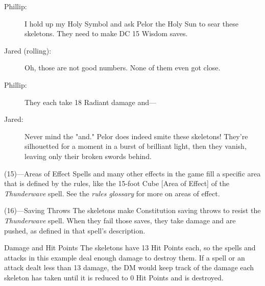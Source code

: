 \documentclass[10pt,a4paper,twoside,bg=print,twocolumn,openany,nodeprecatedcode]{dndbook}
\begin{document}
{\par \vspace { 9pt plus 3pt minus 3pt } \noindent  {} \nopagebreak }

\begin{description}
\item[Phillip:]
I hold up my Holy Symbol and ask Pelor the Holy Sun to sear these skeletons. They need to make DC 15 Wisdom saves.
\end{description}


\begin{description}
\item[Jared (rolling):]
Oh, those are not good numbers. None of them even got close.
\item[Phillip:]
They each take 18 Radiant damage and—
\item[Jared:]
Never mind the "and." Pelor does indeed smite these skeletons! They're silhouetted for a moment in a burst of brilliant light, then they vanish, leaving only their broken swords behind.
\end{description}

\begin{DndSidebar}[float=!b]{(15)—Areas of Effect}
Spells and many other effects in the game fill a specific area that is defined by the rules, like the 15-foot Cube [Area of Effect] of the \textit{Thunderwave} spell. See the \textit{rules glossary} for more on areas of effect.



\end{DndSidebar}

\begin{DndSidebar}[float=!b]{(16)—Saving Throws}
The skeletons make Constitution saving throws to resist the \textit{Thunderwave} spell. When they fail those saves, they take damage and are pushed, as defined in that spell's description.



\end{DndSidebar}

\begin{DndSidebar}[float=!b]{Damage and Hit Points}
The skeletons have 13 Hit Points each, so the spells and attacks in this example deal enough damage to destroy them. If a spell or an attack dealt less than 13 damage, the DM would keep track of the damage each skeleton has taken until it is reduced to 0 Hit Points and is destroyed.



\end{DndSidebar}
\end{document}
